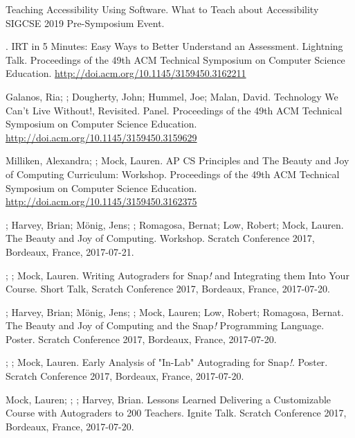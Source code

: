 \begin{etaremune}
    \item{\me Teaching Accessibility Using Software. What to Teach about Accessibility SIGCSE 2019 Pre-Symposium Event.}
    
    \item{\me. IRT in 5 Minutes: Easy Ways to Better Understand an Assessment. Lightning Talk. Proceedings of the 49th ACM Technical Symposium on Computer Science Education.} \href{http://doi.acm.org/10.1145/3159450.3162211}{http://doi.acm.org/10.1145/3159450.3162211}

    \item{Galanos, Ria; \me; Dougherty, John; Hummel, Joe; Malan, David. Technology We Can't Live Without!, Revisited. Panel. Proceedings of the 49th ACM Technical Symposium on Computer Science Education.} \href{http://doi.acm.org/10.1145/3159450.3159629}{http://doi.acm.org/10.1145/3159450.3159629}

    \item{Milliken, Alexandra; \me; Mock, Lauren. AP CS Principles and The Beauty and Joy of Computing Curriculum: Workshop. Proceedings of the 49th ACM Technical Symposium on Computer Science Education.} \href{http://doi.acm.org/10.1145/3159450.3162375}{http://doi.acm.org/10.1145/3159450.3162375}

    
    \item{\dan; Harvey, Brian; Mönig, Jens; \me; Romagosa, Bernat; Low, Robert; Mock, Lauren. The Beauty and Joy of Computing. Workshop. Scratch Conference 2017, Bordeaux, France, 2017-07-21.}

    \item{\me; \dan; Mock, Lauren. Writing Autograders for Snap\textit{!} and Integrating them Into Your Course. Short Talk, Scratch Conference 2017, Bordeaux, France, 2017-07-20.}

    \item{\dan; Harvey, Brian; Mönig, Jens; \me; Mock, Lauren; Low, Robert; Romagosa, Bernat. The Beauty and Joy of Computing and the Snap\textit{!} Programming Language. Poster. Scratch Conference 2017, Bordeaux, France, 2017-07-20.}

    \item{\me; \dan; Mock, Lauren. Early Analysis of "In-Lab" Autograding for Snap\textit{!}. Poster. Scratch Conference 2017, Bordeaux, France, 2017-07-20.}

    \item{Mock, Lauren; \me; \dan; Harvey, Brian. Lessons Learned Delivering a Customizable Course with Autograders to 200 Teachers. Ignite Talk. Scratch Conference 2017, Bordeaux, France, 2017-07-20.}
    

\end{etaremune}
